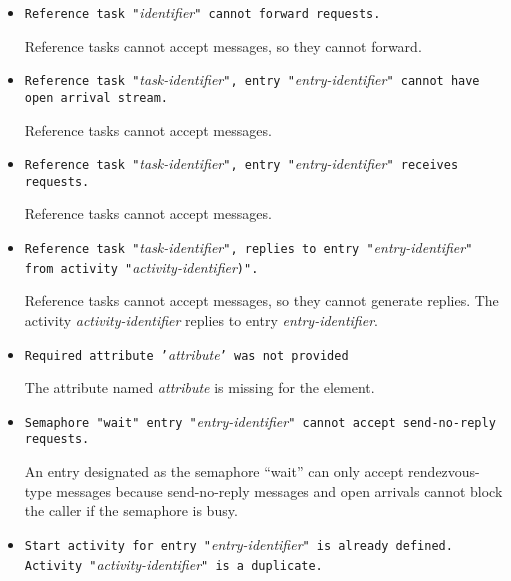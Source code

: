 \begin{itemize}
\item \texttt{Reference task "}\emph{identifier}\texttt{" cannot forward requests.}
  
  Reference tasks cannot accept messages,
  so they cannot forward.

\item \texttt{Reference task "}\emph{task-identifier}\texttt{", entry
    "}\emph{entry-identifier}\texttt{" cannot have open arrival
    stream.}
  
  Reference tasks cannot accept
  messages.

\item \texttt{Reference task "}\emph{task-identifier}\texttt{", entry
    "}\emph{entry-identifier}\texttt{" receives requests.}
  
  Reference tasks cannot accept messages.

\item \texttt{Reference task "}\emph{task-identifier}\texttt{",
    replies to entry "}\emph{entry-identifier}\texttt{" from activity
    "}\emph{activity-identifier}\texttt{)".}
  
  Reference tasks cannot accept messages,
  so they cannot generate replies.  The activity
  \emph{activity-identifier} replies to entry
  \emph{entry-identifier}.

\item \texttt{Required attribute '}\emph{attribute}\texttt{' was not
    provided} 
  
  The attribute named \emph{attribute} is
  missing for the element.

\item \texttt{Semaphore "wait" entry "}\emph{entry-identifier}\texttt{" cannot accept send-no-reply requests.}

  An entry designated as the semaphore
  ``wait'' can only accept
  rendezvous-type messages because send-no-reply messages and open
  arrivals cannot block the caller if the semaphore is busy.

\item \texttt{Start activity for entry
    "}\emph{entry-identifier}\texttt{" is already defined.  Activity
    "}\emph{activity-identifier}\texttt{" is a duplicate.}
  

\end{itemize}
